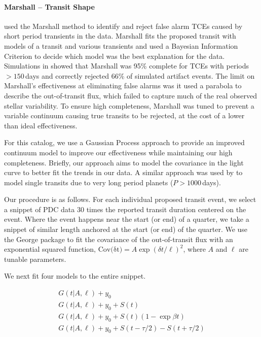 \paragraph{Marshall -- Transit Shape}
\label{s:marshall}
\citet{Coughlin2016} used the Marshall method \citep{Mullally2016} to identify and reject false alarm TCEs caused by short period transients in the data. Marshall fits the proposed transit with models of a transit and various transients and used a Bayesian Information Criterion to decide which model was the best explanation for the data. Simulations in \citet{Mullally2016} showed that Marshall was 95\% complete for TCEs with periods $>150$\,days and correctly rejected 66\% of simulated artifact events. The limit on Marshall's effectiveness at eliminating false alarms was it used a parabola to describe the out-of-transit flux, which failed to capture much of the real observed stellar variability. To ensure high completeness, Marshall was tuned to prevent a variable continuum causing true transits to be rejected, at the cost of a lower than ideal effectiveness.

For this catalog, we use a Gaussian Process approach \citep[GP][]{Rasmussen10} to provide an improved continuum model to improve our effectiveness while maintaining our high completeness. Briefly, our approach aims to model the covariance in the light curve to better fit the trends in our data.
A similar approach was used by \citet{ForemanMackey16} to model single transits due to very long period planets ($P > 1000$\,days).

Our procedure is as follows. For each individual proposed transit event, we select a snippet of PDC data 30 times the reported transit duration centered on the event. Where the event happens near the start (or end) of a quarter, we take a snippet of similar length anchored at the start (or end) of the quarter. We use the George package \citep{Ambikasaran14} to fit the covariance of the out-of-transit flux with an exponential squared function, $ {\mathrm{Cov(\delta t})} = A \exp{ (\delta t/\ell)^2}$, where $A$ and $\ell$ are tunable parameters. 

We next fit four models to the entire snippet.

\begin{equation}
\left.\begin{aligned}
G(t | A, \ell) + y_0 \\
G(t | A, \ell) + y_0 + S(t)\\
G(t | A, \ell) + y_0 + S(t)(1 - \exp{\beta t})\\
G(t | A, \ell) + y_0 + S(t - \tau/2) - S(t + \tau/2) 
\end{aligned}\right.
\end{equation}

